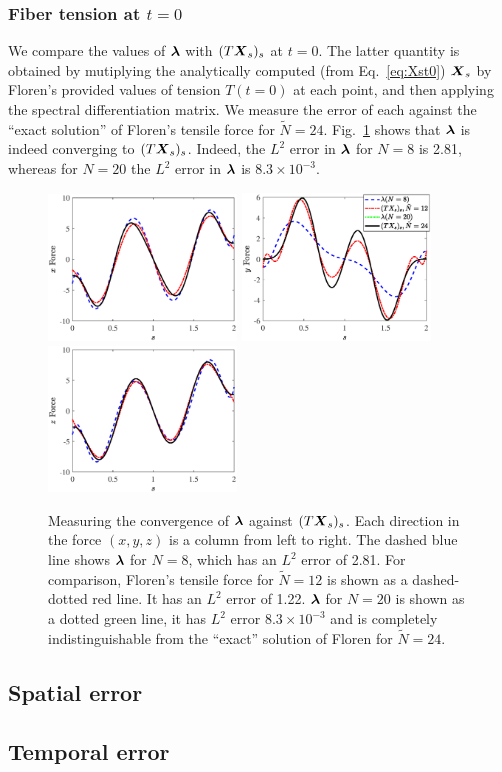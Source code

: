 \documentclass{article}
\newcommand{\bm}[1]{\mbox{\boldmath $ #1 $}}    %
\begin{document}
\subsubsection{Fiber tension at $t=0$}
We compare the values of $\bm{\lambda}$ with $(T\bm{X}_s)_s$ at $t=0$. The latter quantity is obtained by mutiplying the analytically computed (from Eq.\ \eqref{eq:Xst0}) $\bm{X}_s$ by Floren's provided values of tension $T(t=0)$ at each point, and then applying the spectral differentiation matrix. We measure the error of each against the ``exact solution'' of Floren's tensile force for $\tilde{N}=24$. Fig.\ \ref{fig:tension} shows that $\bm{\lambda}$ is indeed converging to $(T\bm{X}_s)_s$. Indeed, the $L^2$ error in $\bm{\lambda}$ for $N=8$ is 2.81, whereas for $N=20$ the $L^2$ error in $\bm{\lambda}$ is $8.3 \times 10^{-3}$. 
\begin{figure}
\centering
\includegraphics[width=50mm]{TensionX.eps}
\includegraphics[width=50mm]{TensionY.eps}
\includegraphics[width=50mm]{TensionZ.eps}
\caption{Measuring the convergence of $\bm{\lambda}$ against $(T\bm{X}_s)_s$. Each direction in the force $(x,y,z)$ is a column from left to right. The dashed blue line shows $\bm{\lambda}$ for $N=8$, which has an $L^2$ error of 2.81. For comparison, Floren's tensile force for $\tilde{N}=12$ is shown as a dashed-dotted red line. It has an $L^2$ error of 1.22. $\bm{\lambda}$ for $N=20$ is shown as a dotted green line, it has $L^2$ error $8.3 \times 10^{-3}$ and is completely indistinguishable from the ``exact'' solution of Floren for $\tilde{N}=24$. }
\label{fig:tension}
\end{figure}

\subsection{Spatial error}
\label{sec:space}


\subsection{Temporal error}
\label{sec:temp}





\end{document}

